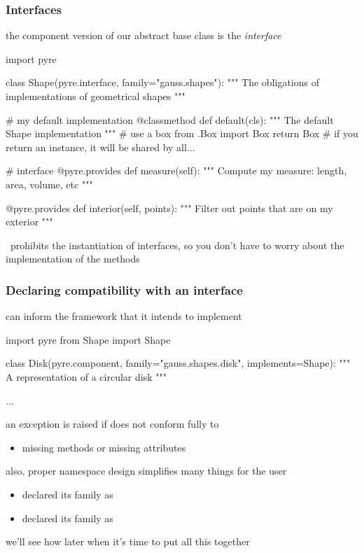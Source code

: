 \begin{frame}[fragile]
%
  \frametitle{Interfaces}
%
  the component version of our abstract base class is the \emph{interface}
%
  \begin{ipython}[basicstyle=\tt\tiny]{}
import pyre

class Shape(pyre.interface, family="gauss.shapes"):
    """
    The obligations of implementations of geometrical shapes
    """

    # my default implementation
    @classmethod
    def default(cls):
        """
        The default {Shape} implementation
        """
        # use a box
        from .Box import Box
        return Box # if you return an instance, it will be shared by all...

    # interface
    @pyre.provides
    def measure(self):
        """
        Compute my measure: length, area, volume, etc
        """
        
    @pyre.provides
    def interior(self, points):
        """
        Filter out {points} that are on my exterior
        """
  \end{ipython}
%
  \pyre\ prohibits the instantiation of interfaces, so you don't have to worry about the
  implementation of the methods
%
\end{frame}

\begin{frame}[fragile]
%
  \frametitle{Declaring compatibility with an interface}
%
   can inform the framework that it intends to implement 
%
  \begin{ipython}{}
import pyre
from Shape import Shape

class Disk(pyre.component, family="gauss.shapes.disk", implements=Shape):
    """
    A representation of a circular disk
    """

    ...
  \end{ipython}
%
  an exception is raised if  does not conform fully to 
%
  \begin{itemize}
  \item missing methods or missing attributes
  \end{itemize}
%
  also, proper namespace design simplifies many things for the user
%
  \begin{itemize}
  \item {} declared its family as 
  \item {} declared its family as 
  \end{itemize}
%
  we'll see how later when it's time to put all this together
%
\end{frame}


